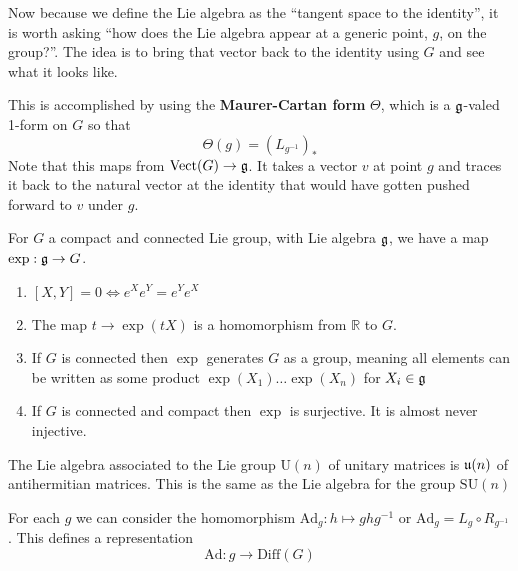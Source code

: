 		
		Now because we define the Lie algebra as the ``tangent space to the identity'', it is worth asking ``how does the Lie algebra appear at a generic point, $g$, on the group?''. The idea is to bring that vector back to the identity using $G$ and see what it looks like. 
		
		This is accomplished by using the \textbf{Maurer-Cartan form} $\Theta$, which is a $\frak g$-valed 1-form on $G$ so that 
		\begin{equation}
			\Theta(g) = (L_{g^{-1}})_*
		\end{equation}
		Note that this maps from $\mathrm{Vect}(G) \rightarrow \frak g$. It takes a vector $v$ at point $g$ and traces it back to the natural vector at the identity that would have gotten pushed forward to $v$ under $g$.
		
		\begin{prop}
			For $G$ a compact and connected Lie group, with Lie algebra $\frak g$, we have a map $\exp : \frak g \rightarrow G$.
			\begin{enumerate}
				\item $[X,Y] = 0 \Leftrightarrow e^X e^Y = e^Y e^X$
				\item The map $t \rightarrow \exp(t X)$ is a homomorphism from $\mathbb R$ to $G$.
				\item If $G$ is connected then $\exp$ generates $G$ as a group, meaning all elements can be written as some product $\exp(X_1) \dots \exp(X_n)$ for $X_i \in \frak g$
				\item If $G$ is connected and compact then $\exp$ is surjective. It is almost never injective.
			\end{enumerate}
		\end{prop}
		
		\begin{eg}
			The Lie algebra associated to the Lie group $\mathrm U(n)$ of unitary matrices is $\frak u(n)$ of antihermitian matrices. This is the same as the Lie algebra for the group $\mathrm{SU}(n)$
		\end{eg}
		
		\begin{defn}
			For each $g$ we can consider the homomorphism $\mathrm{Ad}_g: h \mapsto g h g^{-1}$ or $\mathrm{Ad}_g = L_g \circ R_{g^{-1}}$. This defines a representation
			\begin{equation}
				\mathrm{Ad}: g \rightarrow \mathrm{Diff}(G)
			\end{equation}
		\end{defn}
		
